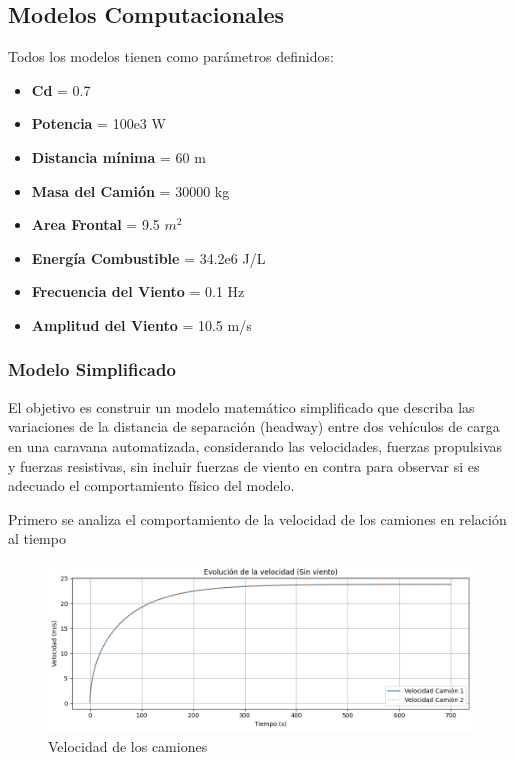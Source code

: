 \documentclass[11pt,stdletter,orderfromtodate,sigleft,twoside]{report}
\begin{document}
\subsection{Modelos Computacionales}

Todos los modelos tienen como parámetros definidos:

\begin{itemize}
    \item \textbf{Cd} = 0.7
    \item  \textbf{Potencia} = 100e3 W
    \item \textbf{Distancia mínima} = 60 m
    \item \textbf{Masa del Camión} = 30000 kg
    \item \textbf{Area Frontal} = 9.5 \(m^2\)
    \item \textbf{Energía Combustible} = 34.2e6 J/L
    \item \textbf{Frecuencia del Viento} = 0.1 Hz
    \item \textbf{Amplitud del Viento} = 10.5 m/s
\end{itemize}

\subsubsection{Modelo Simplificado}

El objetivo es construir un modelo matemático simplificado que describa las variaciones de la distancia de separación (headway) entre dos vehículos de carga en una caravana automatizada, considerando las velocidades, fuerzas propulsivas y fuerzas resistivas, sin incluir fuerzas de viento en contra para observar si es adecuado el comportamiento físico del modelo.

Primero se analiza el comportamiento de la velocidad de los camiones en relación al tiempo

\begin{figure}[H]
    \centering
    \includegraphics[width=0.75\linewidth]{figures//Cars/vel 2 trucks si si .png}
    \caption{Velocidad de los camiones}
    \label{fig:enter-label}
\end{figure}
\end{document}
